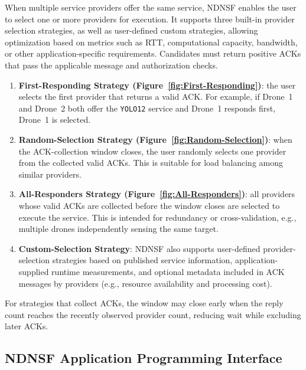 When multiple service providers offer the same service, NDNSF enables the user to select one or more providers for execution. It supports three built-in provider selection strategies, as well as user-defined custom strategies, allowing optimization based on metrics such as RTT, computational capacity, bandwidth, or other application-specific requirements. Candidates must return positive ACKs that pass the applicable message and authorization checks.
\begin{enumerate}
\item \textbf{First-Responding Strategy (Figure~\ref{fig:First-Responding})}: the user selects the first provider that returns a valid ACK. For example, if Drone~1 and Drone~2 both offer the \texttt{YOLO12} service and Drone~1 responds first, Drone~1 is selected.
\item \textbf{Random-Selection Strategy (Figure~\ref{fig:Random-Selection})}: when the ACK-collection window closes, the user randomly selects one provider from the collected valid ACKs. This is suitable for load balancing among similar providers.
\item \textbf{All-Responders Strategy (Figure~\ref{fig:All-Responders})}: all providers whose valid ACKs are collected before the window closes are selected to execute the service. This is intended for redundancy or cross-validation, e.g., multiple drones independently sensing the same target.
\item \textbf{Custom-Selection Strategy}: NDNSF also supports user-defined provider-selection strategies based on published service information, application-supplied runtime measurements, and optional metadata included in ACK messages by providers (e.g., resource availability and processing cost).
\end{enumerate}
For strategies that collect ACKs, the window may close early when the reply count reaches the recently observed provider count, reducing wait while excluding later ACKs.
\subsection{NDNSF Application Programming Interface}
\label{sec:NDNSF-API}

